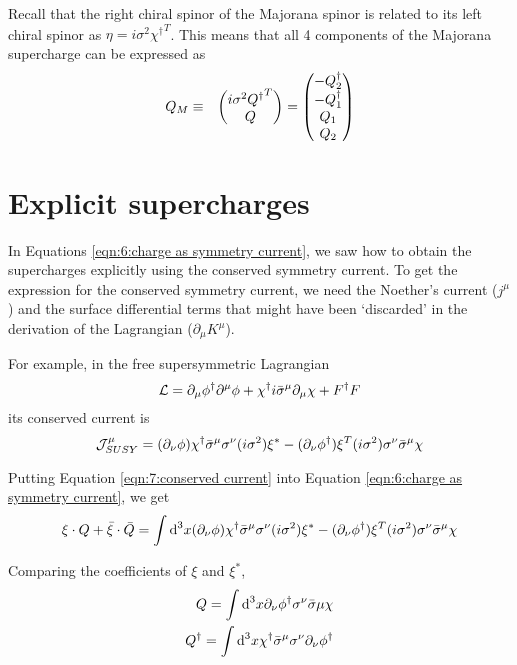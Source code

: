 Recall that the right chiral spinor of the Majorana spinor is related to its left chiral spinor as $\eta = i \sigma^2 {\chi^\dagger}^T$. This means that all 4 components of the Majorana supercharge can be expressed as
\begin{eqnarray}
    Q_M &\equiv& \begin{pmatrix}{i \sigma^2 {Q^\dagger}^T}\\{Q}\end{pmatrix} = \begin{pmatrix} -Q_2^\dagger \\ -Q_1^\dagger \\ Q_1 \\ Q_2 \end{pmatrix}
\end{eqnarray}

\section{Explicit supercharges}
\label{ch:7:explicit supercharges}
In Equations \ref{eqn:6:charge as symmetry current}, we saw how to obtain the supercharges explicitly using the conserved symmetry current. To get the expression for the conserved symmetry current, we need the Noether's current ($j^\mu$) and the surface differential terms that might have been `discarded' in the derivation of the Lagrangian ($\partial_\mu K^\mu$). 

For example, in the free supersymmetric Lagrangian
\begin{equation}
    \mathcal{L} = \partial_\mu \phi^\dagger \partial^\mu \phi + \chi^\dagger i \Bar{\sigma}^\mu \partial_\mu \chi + F^\dagger F
    \label{eqn:7:free lagrangian}
\end{equation}
its conserved current is
\begin{equation}
    \mathcal{J}^\mu_{SUSY} = (\partial_\nu \phi) \chi^\dagger \Bar{\sigma}^\mu \sigma^\nu (i\sigma^2) \xi^* - (\partial_\nu \phi^\dagger) \xi^T (i\sigma^2) \sigma^\nu \Bar{\sigma}^\mu \chi
    \label{eqn:7:conserved current}
\end{equation}

Putting Equation \ref{eqn:7:conserved current} into Equation \ref{eqn:6:charge as symmetry current}, we get
\begin{equation}
    \xi\cdot Q + \Bar{\xi} \cdot \Bar{Q} = \int \text{d}^3 x (\partial_\nu \phi) \chi^\dagger \Bar{\sigma}^\mu \sigma^\nu (i\sigma^2) \xi^* - (\partial_\nu \phi^\dagger) \xi^T (i\sigma^2) \sigma^\nu \Bar{\sigma}^\mu \chi
\end{equation}

Comparing the coefficients of $\xi$ and $\xi^*$,
\begin{eqnarray}
    Q = \int \text{d}^3 x \partial_\nu \phi^\dagger \sigma^\nu \Bar{\sigma}\mu \chi \\
    Q^\dagger = \int \text{d}^3 x \chi^\dagger \Bar{\sigma}^\mu \sigma^\nu \partial_\nu \phi^\dagger
\end{eqnarray}

